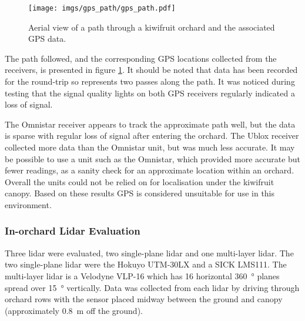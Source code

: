 \documentclass[preprint,authoryear,12pt]{elsarticle}
\begin{document}
        \begin{figure}[htb]
            \centering
            \texttt{[image: imgs/gps\_path/gps\_path.pdf]}
            \caption{
                Aerial view of a path through a kiwifruit orchard and the associated GPS data.
            }
            \label{fig:gpsResults}
        \end{figure}

        The path followed, and the corresponding GPS locations collected from the receivers, is presented in figure \ref{fig:gpsResults}.
        It should be noted that data has been recorded for the round-trip so represents two passes along the path.
        It was noticed during testing that the signal quality lights on both GPS receivers regularly indicated a loss of signal.


        The Omnistar receiver appears to track the approximate path well, but the data is sparse with regular loss of signal after entering the orchard.
    	The Ublox receiver collected more data than the Omnistar unit, but was much less accurate.
        It may be possible to use a unit such as the Omnistar, which provided more accurate but fewer readings, as a sanity check for an approximate location within an orchard.
        Overall the units could not be relied on for localisation under the kiwifruit canopy.
        Based on these results GPS is considered unsuitable for use in this environment.

    \subsubsection{In-orchard Lidar Evaluation}
        Three lidar were evaluated, two single-plane lidar and one multi-layer lidar.
        The two single-plane lidar were the Hokuyo UTM-30LX and a SICK LMS111.
        The multi-layer lidar is a Velodyne VLP-16 which has 16 horizontal \SI{360}{\degree} planes spread over \SI{15}{\degree} vertically.
        Data was collected from each lidar by driving through orchard rows with the sensor placed midway between the ground and canopy (approximately \SI{0.8}{\meter} off the ground).
\end{document}
